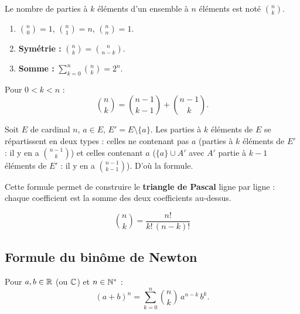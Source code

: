 \begin{defbox}
Le nombre de parties à $k$ éléments d'un ensemble à $n$ éléments est noté $\displaystyle\binom{n}{k}$.
\end{defbox}

\begin{propbox}
\begin{enumerate}[leftmargin=1.5cm]
  \item $\displaystyle\binom{n}{0} = 1$, \quad $\displaystyle\binom{n}{1} = n$, \quad $\displaystyle\binom{n}{n} = 1$.
  \item \textbf{Symétrie :} $\displaystyle\binom{n}{k} = \binom{n}{n-k}$.
  \item \textbf{Somme :} $\displaystyle\sum_{k=0}^{n} \binom{n}{k} = 2^n$.
\end{enumerate}
\end{propbox}

\begin{propbox}
Pour $0 < k < n$ :
\[\binom{n}{k} = \binom{n-1}{k-1} + \binom{n-1}{k}.\]
\end{propbox}

\begin{proofbox}
Soit $E$ de cardinal $n$, $a \in E$, $E' = E \setminus \{a\}$. Les parties à $k$ éléments de $E$ se répartissent en deux types : celles ne contenant pas $a$ (parties à $k$ éléments de $E'$ : il y en a $\binom{n-1}{k}$) et celles contenant $a$ ($\{a\} \cup A'$ avec $A'$ partie à $k-1$ éléments de $E'$ : il y en a $\binom{n-1}{k-1}$). D'où la formule.
\end{proofbox}

Cette formule permet de construire le \textbf{triangle de Pascal} ligne par ligne : chaque coefficient est la somme des deux coefficients au-dessus.

\begin{propbox}
\[\binom{n}{k} = \frac{n!}{k!\,(n-k)!}\]
\end{propbox}


\subsection{Formule du binôme de Newton}

\begin{thmbox}
Pour $a, b \in \mathbb{R}$ (ou $\mathbb{C}$) et $n \in \mathbb{N}^*$ :
\[(a + b)^n = \sum_{k=0}^{n} \binom{n}{k}\, a^{n-k}\, b^k.\]
\end{thmbox}

